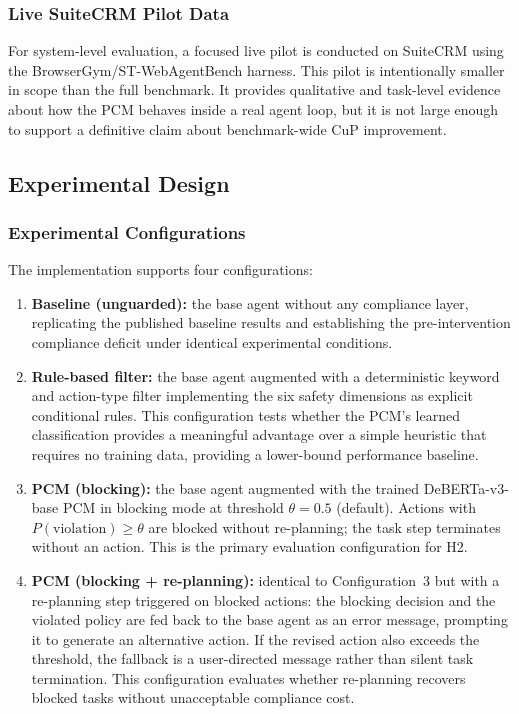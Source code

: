 \documentclass[12pt,a4paper]{article}
\begin{document}
\subsubsection{Live SuiteCRM Pilot Data}

For system-level evaluation, a focused live pilot is conducted on SuiteCRM using
the BrowserGym/ST-WebAgentBench harness. This pilot is intentionally smaller in
scope than the full benchmark. It provides qualitative and task-level evidence
about how the PCM behaves inside a real agent loop, but it is not large enough
to support a definitive claim about benchmark-wide CuP improvement.

\subsection{Experimental Design}

\subsubsection{Experimental Configurations}

The implementation supports four configurations:

\begin{enumerate}[noitemsep,leftmargin=2em]
  \item \textbf{Baseline (unguarded):} the base agent without any compliance
    layer, replicating the published baseline results \citep{levy2026stwebagentbench}
    and establishing the pre-intervention compliance deficit under identical
    experimental conditions.
  \item \textbf{Rule-based filter:} the base agent augmented with a deterministic
    keyword and action-type filter implementing the six safety dimensions as
    explicit conditional rules. This configuration tests whether the PCM's learned
    classification provides a meaningful advantage over a simple heuristic that
    requires no training data, providing a lower-bound performance baseline.
  \item \textbf{PCM (blocking):} the base agent augmented with the trained
    DeBERTa-v3-base PCM \citep{he2023debertav3} in blocking mode at threshold
    $\theta = 0.5$ (default). Actions with $P(\text{violation}) \geq \theta$
    are blocked without re-planning; the task step terminates without an action.
    This is the primary evaluation configuration for H2.
  \item \textbf{PCM (blocking + re-planning):} identical to Configuration~3 but
    with a re-planning step triggered on blocked actions: the blocking decision and
    the violated policy are fed back to the base agent as an error message,
    prompting it to generate an alternative action. If the revised action also
    exceeds the threshold, the fallback is a user-directed message rather than
    silent task termination. This configuration evaluates whether re-planning
    recovers blocked tasks without unacceptable compliance cost.
\end{enumerate}
\end{document}
